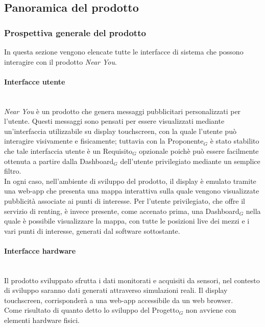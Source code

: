 \documentclass[11pt]{article}
\begin{document}
\begin{justify}
\subsection{Panoramica del prodotto}
\subsubsection{Prospettiva generale del prodotto} 
In questa sezione vengono elencate tutte le interfacce di sistema che possono interagire con il prodotto \textit{Near You}.

\paragraph{Interfacce utente}\mbox{}\\
\textit{Near You} è un prodotto che genera messaggi pubblicitari personalizzati per l'utente. Questi messaggi sono pensati per essere visualizzati mediante un'interfaccia utilizzabile su display touchscreen, con la quale l'utente può interagire visivamente e fisicamente; tuttavia con la Proponente$_G$ è stato stabilito che tale interfaccia utente 
è un Requisito$_G$ opzionale poichè può essere facilmente ottenuta a partire dalla Dashboard$_G$ dell'utente privilegiato mediante un semplice filtro.\\
In ogni caso, nell'ambiente di sviluppo del prodotto, il display è emulato tramite una web-app che presenta una mappa interattiva sulla quale vengono visualizzate pubblicità associate ai punti di interesse. Per l'utente 
privilegiato, che offre il servizio di renting, è invece presente, come accenato prima, una Dashboard$_G$ nella quale è possibile visualizzare la mappa, con tutte le posizioni live dei mezzi e i vari punti di interesse, 
generati dal software sottostante.

\paragraph{Interfacce hardware}\mbox{}\\
Il prodotto sviluppato sfrutta i dati monitorati e acquisiti da sensori, nel contesto di sviluppo saranno dati generati attraverso simulazioni reali. Il display touchscreen, corrisponderà a una web-app accessibile da un web browser.\\
Come risultato di quanto detto lo sviluppo del Progetto$_G$ non avviene con elementi hardware fisici.


\end{justify}
\end{document}
